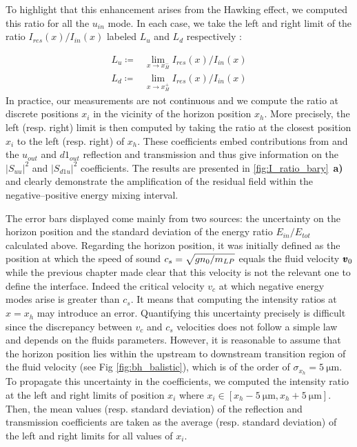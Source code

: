 To highlight that this enhancement arises from the Hawking effect, we computed this ratio for all the $u_{in}$ mode. In each case, we take the left and right limit of the ratio $I_{res}(x)/I_{in}(x)$  labeled $L_u$ and $L_d$ respectively :
 
\begin{equation}
    \begin{aligned}
        L_u \coloneqq &\lim_{x\to x_H^-}I_{res}(x)/I_{in}(x) \\
        L_d \coloneqq &\lim_{x\to x_H^+}I_{res}(x)/I_{in}(x)
    \end{aligned}
\end{equation}
In practice, our measurements are not continuous and we compute the ratio at discrete positions $x_i$ in the vicinity of the horizon position $x_h$. More precisely,
the left (resp. right) limit is then computed by taking the ratio at the closest position $x_i$ to the left (resp. right) of $x_h$.      
These coefficients embed contributions from and the $u_{out}$ and $d1_{out}$ reflection and transmission and thus give information on the $|S_{uu}|^2$ and $|S_{d1u}|^2$ coefficients.
The results are presented in \autoref{fig:I_ratio_bary}~\textbf{a)} and clearly demonstrate the amplification of the residual field within the negative–positive energy mixing interval.


The error bars displayed come mainly from two sources: the uncertainty on the horizon position and the standard deviation of the energy ratio $E_{in}/E_{tot}$ calculated above.
Regarding the horizon position, it was initially defined as the position at which the speed of sound $c_s=\sqrt{gn_0/m_{LP}}$ equals the fluid velocity $\pmb{v}_0$ while the previous chapter made clear
that this velocity is not the relevant one to define the interface. Indeed the critical velocity $v_c$ at which negative energy modes arise is greater than $c_s$. It means that computing the intensity ratios at $x=x_h$ may introduce an error. Quantifying this uncertainty precisely is difficult since the discrepancy between $v_c$ and $c_s$ velocities does not follow a simple law and depends on the fluids parameters. However, it is reasonable to assume that the horizon position lies within the upstream to downstream transition region of the fluid velocity (see Fig \ref{fig:bh_balistic}), which is of the order of $\sigma_{x_h}=\SI{5}{\micro \meter}$.
To propagate this uncertainty in the coefficients, we computed the intensity ratio at the left and right limits of position $x_i$ where $x_i \in [x_h-\SI{5}{\micro \meter}, x_h+\SI{5}{\micro \meter}]$. Then,
the mean values (resp. standard deviation) of the reflection and transmission coefficients are taken as the average (resp. standard deviation) of the left and right limits for all values of $x_i$. 

